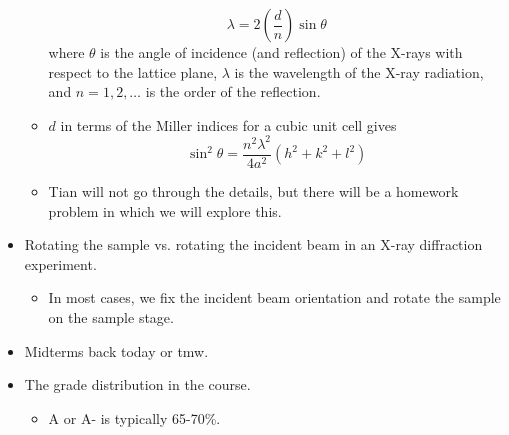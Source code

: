 \documentclass[../notes.tex]{subfiles}
\begin{document}
\begin{itemize}
\begin{itemize}
\begin{equation*}
            \lambda=2\left( \frac{d}{n} \right)\sin\theta
        \end{equation*}
        where $\theta$ is the angle of incidence (and reflection) of the X-rays with respect to the lattice plane, $\lambda$ is the wavelength of the X-ray radiation, and $n=1,2,\dots$ is the order of the reflection.
        \item $d$ in terms of the Miller indices for a cubic unit cell gives
        \begin{equation*}
            \sin^2\theta = \frac{n^2\lambda^2}{4a^2}(h^2+k^2+l^2)
        \end{equation*}
        \item Tian will not go through the details, but there will be a homework problem in which we will explore this.
    \end{itemize}
    \item Rotating the sample vs. rotating the incident beam in an X-ray diffraction experiment.
    \begin{itemize}
        \item In most cases, we fix the incident beam orientation and rotate the sample on the sample stage.
    \end{itemize}
    \item Midterms back today or tmw.
    \item The grade distribution in the course.
    \begin{itemize}
        \item A or A- is typically 65-70\%.
    \end{itemize}
\end{itemize}
\end{document}
